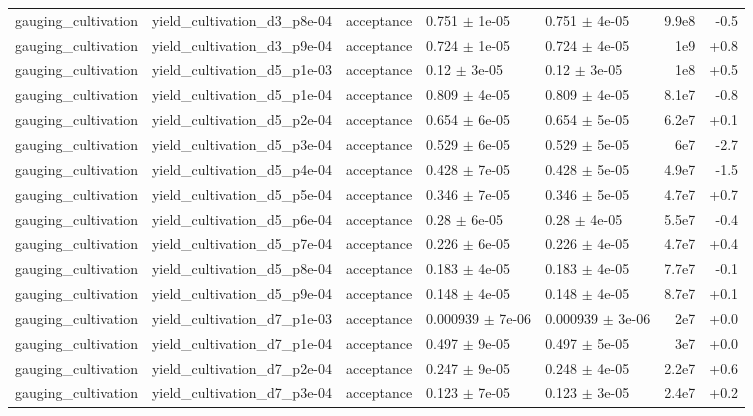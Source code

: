 \documentclass[10pt]{article}
\begin{document}
{\begin{longtable}{l l l l l r r}
gauging\_cultivation & yield\_cultivation\_d3\_p8e-04 & acceptance & 0.751 $\pm$ 1e-05 & 0.751 $\pm$ 4e-05 & 9.9e8 & -0.5 \\
gauging\_cultivation & yield\_cultivation\_d3\_p9e-04 & acceptance & 0.724 $\pm$ 1e-05 & 0.724 $\pm$ 4e-05 & 1e9 & +0.8 \\
gauging\_cultivation & yield\_cultivation\_d5\_p1e-03 & acceptance & 0.12 $\pm$ 3e-05 & 0.12 $\pm$ 3e-05 & 1e8 & +0.5 \\
gauging\_cultivation & yield\_cultivation\_d5\_p1e-04 & acceptance & 0.809 $\pm$ 4e-05 & 0.809 $\pm$ 4e-05 & 8.1e7 & -0.8 \\
gauging\_cultivation & yield\_cultivation\_d5\_p2e-04 & acceptance & 0.654 $\pm$ 6e-05 & 0.654 $\pm$ 5e-05 & 6.2e7 & +0.1 \\
gauging\_cultivation & yield\_cultivation\_d5\_p3e-04 & acceptance & 0.529 $\pm$ 6e-05 & 0.529 $\pm$ 5e-05 & 6e7 & -2.7 \\
gauging\_cultivation & yield\_cultivation\_d5\_p4e-04 & acceptance & 0.428 $\pm$ 7e-05 & 0.428 $\pm$ 5e-05 & 4.9e7 & -1.5 \\
gauging\_cultivation & yield\_cultivation\_d5\_p5e-04 & acceptance & 0.346 $\pm$ 7e-05 & 0.346 $\pm$ 5e-05 & 4.7e7 & +0.7 \\
gauging\_cultivation & yield\_cultivation\_d5\_p6e-04 & acceptance & 0.28 $\pm$ 6e-05 & 0.28 $\pm$ 4e-05 & 5.5e7 & -0.4 \\
gauging\_cultivation & yield\_cultivation\_d5\_p7e-04 & acceptance & 0.226 $\pm$ 6e-05 & 0.226 $\pm$ 4e-05 & 4.7e7 & +0.4 \\
gauging\_cultivation & yield\_cultivation\_d5\_p8e-04 & acceptance & 0.183 $\pm$ 4e-05 & 0.183 $\pm$ 4e-05 & 7.7e7 & -0.1 \\
gauging\_cultivation & yield\_cultivation\_d5\_p9e-04 & acceptance & 0.148 $\pm$ 4e-05 & 0.148 $\pm$ 4e-05 & 8.7e7 & +0.1 \\
gauging\_cultivation & yield\_cultivation\_d7\_p1e-03 & acceptance & 0.000939 $\pm$ 7e-06 & 0.000939 $\pm$ 3e-06 & 2e7 & +0.0 \\
gauging\_cultivation & yield\_cultivation\_d7\_p1e-04 & acceptance & 0.497 $\pm$ 9e-05 & 0.497 $\pm$ 5e-05 & 3e7 & +0.0 \\
gauging\_cultivation & yield\_cultivation\_d7\_p2e-04 & acceptance & 0.247 $\pm$ 9e-05 & 0.248 $\pm$ 4e-05 & 2.2e7 & +0.6 \\
gauging\_cultivation & yield\_cultivation\_d7\_p3e-04 & acceptance & 0.123 $\pm$ 7e-05 & 0.123 $\pm$ 3e-05 & 2.4e7 & +0.2 \\

\end{longtable}}
\end{document}
